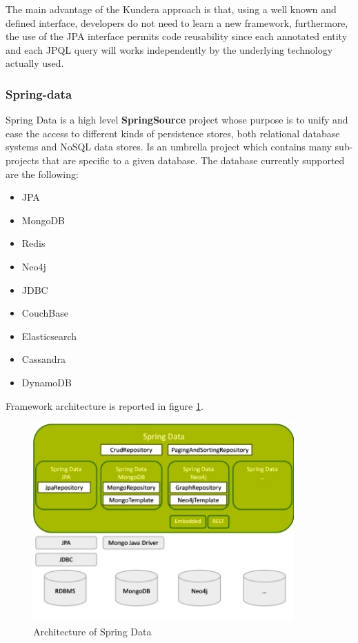 \newparagraph The main advantage of the Kundera approach is that, using a well known and defined interface, developers do not need to learn a new framework, furthermore, the use of the JPA interface permits code reusability since each annotated entity and each JPQL query will works independently by the underlying technology actually used.

\subsubsection{Spring-data}
Spring Data \cite{online:spring-data} is a high level \textbf{SpringSource} project whose purpose is to unify and ease the access to different kinds of persistence stores, both relational database systems and NoSQL data stores. Is an umbrella project which contains many sub-projects that are specific to a given database. The database currently supported are the following:
\begin{itemize}
\item JPA
\item MongoDB
\item Redis
\item Neo4j
\item JDBC
\item CouchBase
\item Elasticsearch
\item Cassandra
\item DynamoDB
\end{itemize}

\noindent Framework architecture is reported in figure \ref{fig:spring-data-overview}.

\begin{figure}[tbh]
  \centering
  \includegraphics[width=10cm]{images/spring_data_overview}
  \caption{Architecture of Spring Data \cite{online:spring-data-overview}}
  \label{fig:spring-data-overview}
\end{figure}

